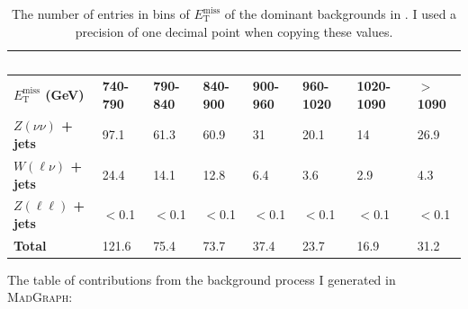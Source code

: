 \begin{table}[H]
\begin{tabular}{|l|lllllll|}
    ~            & ~       & ~       & ~        & ~       & ~        & ~         & ~       \\ \hline
    
    \textbf{$E_{\mathrm{T}}^{\mathrm{miss}}$ (GeV)}      & \textbf{740-790} & \textbf{790-840} & \textbf{840-900}  & \textbf{900-960} & \textbf{960-1020} & \textbf{1020-1090} & \textbf{$>$1090}   \\ \hline
    
    \textbf{$Z(\nu\nu)$ + jets} & 97.1    & 61.3    & 60.9     & 31      & 20.1     & 14        & 26.9    \\ \hline
    \textbf{$W(\ell\nu)$ + jets} & 24.4    & 14.1    & 12.8     & 6.4     & 3.6      & 2.9       & 4.3     \\ \hline
    \textbf{$Z(\ell\ell)$ + jets} & $<$0.1   & $<$0.1   & $<$0.1    & $<$0.1   & $<$0.1    & $<$0.1     & $<$0.1   \\ \hline
    \textbf{Total}        & 121.6 & 75.4  & 73.7   & 37.4  & 23.7   & 16.9    & 31.2  \\ \hline
    \end{tabular}
    \caption{The number of entries in bins of $E_{\mathrm{T}}^{\mathrm{miss}}$ of the dominant backgrounds in \cite{CMS:2016pod}. I used a precision of one decimal point when copying these values.}
    \label{tab:cmspaper}
\end{table}

The table of contributions from the background process I generated in \textsc{MadGraph}:

